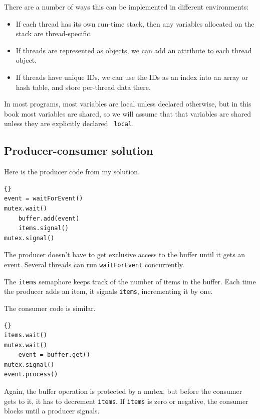 \documentclass{book}
\begin{document}
There are a number of ways this can be implemented in different
environments:

\begin{itemize}

    \item If each thread has its own run-time stack, then any variables
          allocated on the stack are thread-specific.

    \item If threads are represented as objects, we can add an attribute
          to each thread object.

    \item If threads have unique IDs, we can use the IDs as an index
          into an array or hash table, and store per-thread data there.

\end{itemize}

In most programs, most variables are local unless declared otherwise,
but in this book most variables are shared, so we will assume that
that variables are shared unless they are explicitly declared {\tt
        local}.




\subsection{Producer-consumer solution}

Here is the producer code from my solution.

\begin{lstlisting}[title={Producer solution}]{}
event = waitForEvent()
mutex.wait()
    buffer.add(event)
    items.signal()
mutex.signal()
\end{lstlisting}

The producer doesn't have to get exclusive access to the buffer
until it gets an event.  Several threads can run {\tt waitForEvent}
concurrently.

The {\tt items} semaphore keeps track of the
number of items in the buffer.  Each time the producer adds an
item, it signals {\tt items}, incrementing it by one.

The consumer code is similar.

\begin{lstlisting}[title={Consumer solution}]{}
items.wait()
mutex.wait()
    event = buffer.get()
mutex.signal()
event.process()
\end{lstlisting}

Again, the buffer operation is protected by a mutex,
but before the consumer gets to it, it has to decrement
    {\tt items}.  If {\tt items} is zero or negative, the
consumer blocks until a producer signals.
\end{document}
